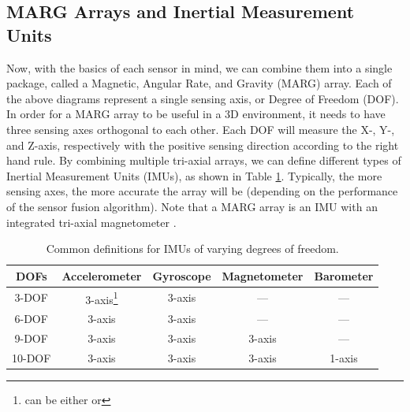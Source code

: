 \subsection{MARG Arrays and Inertial Measurement Units} \label{ssec:marg_imu}
Now, with the basics of each sensor in mind, we can combine them into a single package, called a Magnetic, Angular Rate, and Gravity (MARG) array.
Each of the above diagrams represent a single sensing axis, or Degree of Freedom (DOF).
In order for a MARG array to be useful in a 3D environment, it needs to have three sensing axes orthogonal to each other.
Each DOF will measure the X-, Y-, and Z-axis, respectively with the positive sensing direction according to the right hand rule.
By combining multiple tri-axial arrays, we can define different types of Inertial Measurement Units (IMUs), as shown in Table \ref{tab:imu_dofs}.
Typically, the more sensing axes, the more accurate the array will be (depending on the performance of the sensor fusion algorithm).
Note that a MARG array is an IMU with an integrated tri-axial magnetometer .

\begin{table}[h]
    \caption{Common definitions for IMUs of varying degrees of freedom.}
    \label{tab:imu_dofs}
    \centering
    \begin{tabular}{| c | c | c | c | c |}
        \hline
        DOFs & Accelerometer & Gyroscope & Magnetometer & Barometer \\
        \hline
        3-DOF & 3-axis\footnote[2]{can be either or} & 3-axis\footnote[2] & --- & --- \\
        6-DOF & 3-axis & 3-axis & --- & --- \\
        9-DOF & 3-axis & 3-axis & 3-axis & --- \\
        10-DOF & 3-axis & 3-axis & 3-axis & 1-axis \\
        \hline
    \end{tabular}
\end{table}

